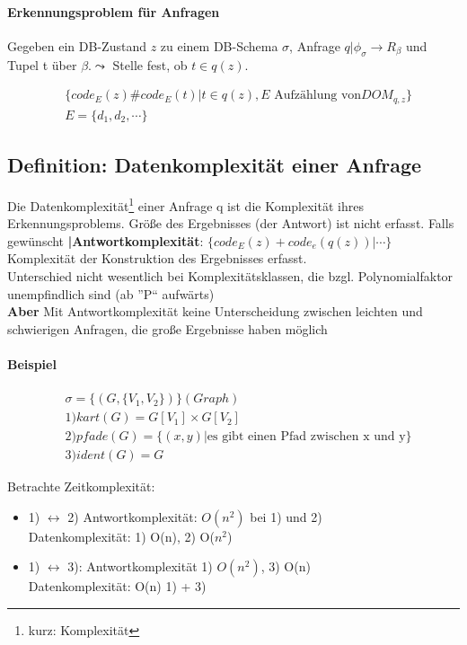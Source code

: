 \documentclass[12pt, a4paper]{article}
\begin{document}
\paragraph{Erkennungsproblem für Anfragen} Gegeben ein DB-Zustand  $z$ zu einem DB-Schema $\sigma$, Anfrage $q | \phi_\sigma \rightarrow R_\beta$ und Tupel t über $\beta. \leadsto$ Stelle fest, ob $t \in q(z)$.

\begin{align*}
&\{ code_E(z) \# code_E(t) | t \in q(z), E \text{ Aufzählung von} DOM_{q,z} \} \\
&E =  \{ d_1, d_2, \cdots \}
\end{align*}


\subsection*{Definition: Datenkomplexität einer Anfrage}
Die Datenkomplexität\footnote{kurz: Komplexität} einer Anfrage q ist die Komplexität ihres Erkennungsproblems. Größe des Ergebnisses (der Antwort) ist nicht erfasst. Falls gewünscht \textbf{|Antwortkomplexität}: $\{ code_E(z) + code_e(q(z))  | \cdots \}$ Komplexität der Konstruktion des Ergebnisses erfasst. \\
Unterschied nicht wesentlich bei Komplexitätsklassen, die bzgl. Polynomialfaktor unempfindlich sind (ab ''P`` aufwärts) \\

\textbf{Aber} Mit Antwortkomplexität keine Unterscheidung zwischen leichten und schwierigen Anfragen, die große Ergebnisse haben möglich

\paragraph{Beispiel}

\begin{align*}
&\sigma = \{ (G, \{ V_1, V_2 \}) \} (Graph) \\
& 1) kart(G) = G[V_1] \times G[V_2] \\
&2) pfade(G) = \{ (x,y) | \text{es gibt einen Pfad zwischen x und y} \} \\
&3) ident(G) = G
\end{align*}

Betrachte Zeitkomplexität: 
\begin{itemize}
\item 1) $\leftrightarrow$ 2) Antwortkomplexität: $O(n^2)$ bei 1) und 2) \\
Datenkomplexität: 1) O(n), 2) O($n^2$)
\item 1) $\leftrightarrow$ 3): Antwortkomplexität 1) $O(n^2)$, 3) O(n) \\
Datenkomplexität: O(n) 1) + 3)
\end{itemize}
\end{document}
